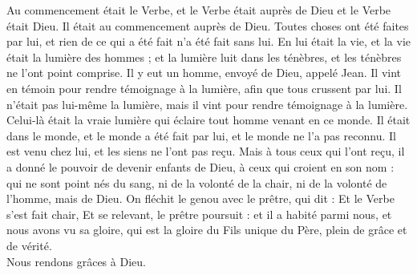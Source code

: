 \documentclass[twoside]{article}
\begin{document}
\begin{paracol}{2}
Au commencement était le Verbe, et le Verbe était auprès de Dieu et le Verbe était Dieu. Il était au commencement auprès de Dieu. Toutes choses ont été faites par lui, et rien de ce qui a été fait n’a été fait sans lui. En lui était la vie, et la vie était la lumière des hommes ; et la lumière luit dans les ténèbres, et les ténèbres ne l’ont point comprise.
Il y eut un homme, envoyé de Dieu, appelé Jean. Il vint en témoin pour rendre témoignage à la lumière, afin que tous crussent par lui. Il n’était pas lui-même la lumière, mais il vint pour rendre témoignage à la lumière.
Celui-là était la vraie lumière qui éclaire tout homme venant en ce monde. Il était dans le monde, et le monde a été fait par lui, et le monde ne l’a pas reconnu. Il est venu chez lui, et les siens ne l’ont pas reçu.
Mais à tous ceux qui l’ont reçu, il a donné le pouvoir de devenir enfants de Dieu, à ceux qui croient en son nom : qui ne sont point nés du sang, ni de la volonté de la chair, ni de la volonté de l’homme, mais de Dieu. On fléchit le genou avec le prêtre, qui dit : Et le Verbe s’est fait chair, Et se relevant, le prêtre poursuit : et il a habité parmi nous, et nous avons vu sa gloire, qui est la gloire du Fils unique du Père, plein de grâce et de vérité.\\
\rr Nous rendons grâces à Dieu.

\end{paracol}
\end{document}
